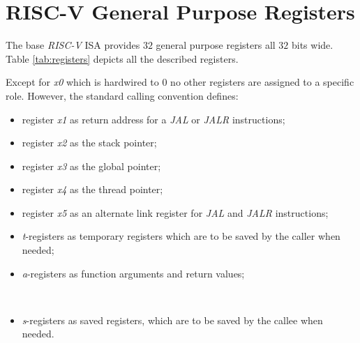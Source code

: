 \section{RISC-V General Purpose Registers}
\label{sec:riscv_reg}

The base \textit{RISC-V} ISA provides $32$ general purpose registers all $32$
bits wide. Table \ref{tab:registers} depicts all the described registers.

Except for \textit{x0} which is hardwired to $0$ no other registers are assigned
to a specific role. However, the standard calling convention defines:
\begin{itemize}[noitemsep]
  \item register \textit{x1} as return address for a \textit{JAL} or \textit{JALR}
    instructions;

  \item register \textit{x2} as the stack pointer;

  \item register \textit{x3} as the global pointer;

  \item register \textit{x4} as the thread pointer;

  \item register \textit{x5} as an alternate link register for \textit{JAL} and \textit{JALR}
    instructions;

  \item \textit{t}-registers as temporary registers which are to be saved by the
    caller when needed;

  \item \textit{a}-registers as function arguments and return values;

      

  \item \textit{s}-registers as saved registers, which are to be saved by the callee
    when needed.
\end{itemize}

